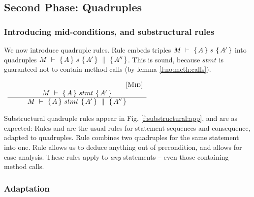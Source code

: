 
\subsection{Second Phase: Quadruples}
\label{s:hoare:second}

\subsubsection{Introducing  mid-conditions, and substructural rules}
We now introduce  quadruple rules. %
Rule {} embeds  triples  ${M\ \vdash\ \{\,A\, \} \ s\  \{\,A'\, \} }$  into quadruples ${M\ \vdash\ \{\,A\, \} \ s\  \{\,A'\, \}\, \,\parallel\,\, \{\, A'' \, \} }$.
This is sound, because $stmt$ is guaranteed not to contain method calls (by lemma \ref{l:no:meth:calls}).

\begin{center}
$
\begin{array}{c}
\begin{array}{c} \strut \ \ \ \ \ \ \ \ \ \ \ \ \ \ \ \ \ \ \ \ \ \ \ \ \ \ \ \ \ \ \ \ \ \ \ \ \ \ \ \ \ \ \ \ \ \ \ \ \ \ {{\mbox{[\sc{Mid}]}}} \\ M\ \vdash\ \{\,A\, \} \ stmt\  \{\,A'\, \}  \\ \hline M\ \vdash\ \{\,A\, \} \ stmt\  \{\,A'\, \}\, \,\parallel\,\, \{\, A'' \, \}  \end{array}
  \end{array}
 $
 \end{center}
 
Substructural quadruple rules appear in  Fig. \ref{f:substructural:app}, and are as expected: 
Rules   {} and {} are  the usual rules for statement sequences and consequence, adapted to quadruples.
Rule {} combines two quadruples for the same statement into one.
Rule  {} allows us to deduce anything out of  precondition, and  {} allows for case analysis.
These  rules  apply to \emph{any} statements -- even those containing method calls.

\subsubsection{Adaptation}


